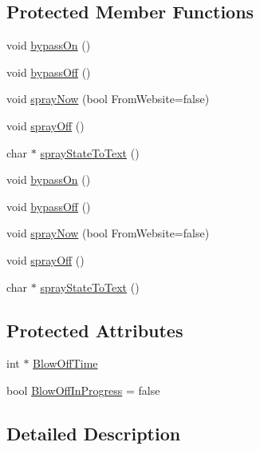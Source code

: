 \subsection*{Protected Member Functions}
\begin{DoxyCompactItemize}
\item 
void \hyperlink{class_aeroponics___no_tank_ab27144182f7b2a87da8e24b626bccf24}{bypass\+On} ()
\item 
void \hyperlink{class_aeroponics___no_tank_a5b6d9ce2f5eb4bdfa1eae495a7d1c5d7}{bypass\+Off} ()
\item 
void \hyperlink{class_aeroponics___no_tank_a91a9ce3552f1f726d26aa79fad04116e}{spray\+Now} (bool From\+Website=false)
\item 
void \hyperlink{class_aeroponics___no_tank_a37537625cd3d80d6c49adeae298d4a76}{spray\+Off} ()
\item 
char $\ast$ \hyperlink{class_aeroponics___no_tank_aa5c6ddd4017a8666d0205da53f04c36d}{spray\+State\+To\+Text} ()
\item 
void \hyperlink{class_aeroponics___no_tank_ab27144182f7b2a87da8e24b626bccf24}{bypass\+On} ()
\item 
void \hyperlink{class_aeroponics___no_tank_a5b6d9ce2f5eb4bdfa1eae495a7d1c5d7}{bypass\+Off} ()
\item 
void \hyperlink{class_aeroponics___no_tank_a91a9ce3552f1f726d26aa79fad04116e}{spray\+Now} (bool From\+Website=false)
\item 
void \hyperlink{class_aeroponics___no_tank_a37537625cd3d80d6c49adeae298d4a76}{spray\+Off} ()
\item 
char $\ast$ \hyperlink{class_aeroponics___no_tank_a9776da3e3fdf7d687609ba72ea59af5f}{spray\+State\+To\+Text} ()
\end{DoxyCompactItemize}
\subsection*{Protected Attributes}
\begin{DoxyCompactItemize}
\item 
int $\ast$ \hyperlink{class_aeroponics___no_tank_a6e28c700e8f725f25c978d071dec9d70}{Blow\+Off\+Time}
\item 
bool \hyperlink{class_aeroponics___no_tank_a32cb324acd8979937da5fed0ba41415e}{Blow\+Off\+In\+Progress} = false
\end{DoxyCompactItemize}


\subsection{Detailed Description}


